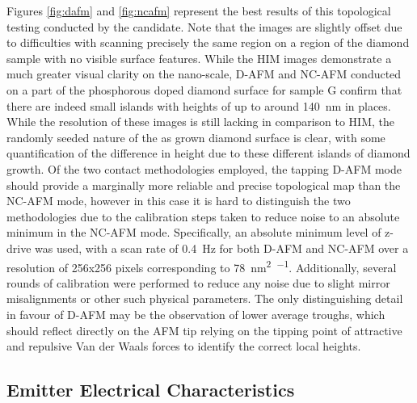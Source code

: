 \begin{refsection}
Figures \ref{fig:dafm} and \ref{fig:ncafm} represent the best results of this topological testing conducted by the candidate. Note that the images are slightly offset due to difficulties with scanning precisely the same region on a region of the diamond sample with no visible surface features. While the HIM images demonstrate a much greater visual clarity on the nano-scale, D-AFM and NC-AFM conducted on a part of the phosphorous doped diamond surface for sample G confirm that there are indeed small islands with heights of up to around 140~\si{\nano\metre} in places. While the resolution of these images is still lacking in comparison to HIM, the randomly seeded nature of the as grown diamond surface is clear, with some quantification of the difference in height due to these different islands of diamond growth. Of the two contact methodologies employed, the tapping D-AFM mode should provide a marginally more reliable and precise topological map than the NC-AFM mode, however in this case it is hard to distinguish the two methodologies due to the calibration steps taken to reduce noise to an absolute minimum in the NC-AFM mode. Specifically, an absolute minimum level of z-drive was used, with a scan rate of 0.4~\si{\hertz} for both D-AFM and NC-AFM over a resolution of 256x256 pixels corresponding to 78~\si{\nano\metre\squared\per\pixel}. Additionally, several rounds of calibration were performed to reduce any noise due to slight mirror misalignments or other such physical parameters. The only distinguishing detail in favour of D-AFM may be the observation of lower average troughs, which should reflect directly on the AFM tip relying on the tipping point of attractive and repulsive Van der Waals forces to identify the correct local heights.

\subsection{Emitter Electrical Characteristics}


\end{refsection}
